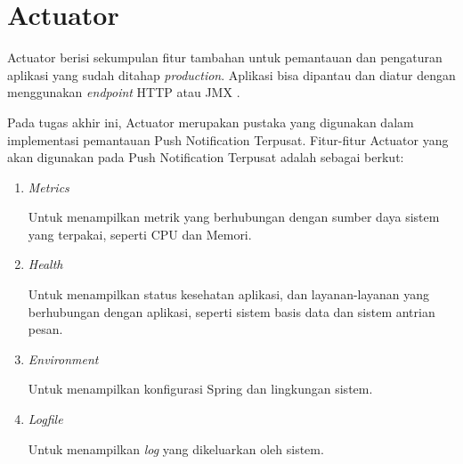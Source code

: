 \section{Actuator}
\par Actuator berisi sekumpulan fitur tambahan untuk pemantauan dan pengaturan aplikasi yang sudah ditahap \textit{production}. Aplikasi bisa dipantau dan diatur dengan menggunakan \textit{endpoint} HTTP atau JMX \cite{actuator-online}.
\par Pada tugas akhir ini, Actuator merupakan pustaka yang digunakan dalam implementasi pemantauan Push Notification Terpusat. Fitur-fitur Actuator yang akan digunakan pada Push Notification Terpusat adalah sebagai berkut:
\begin{enumerate}[listparindent=2.5em]
	\item \textit{Metrics}
	\par Untuk menampilkan metrik yang berhubungan dengan sumber daya sistem yang terpakai, seperti CPU dan Memori.
	\item \textit{Health}
	\par Untuk menampilkan status kesehatan aplikasi, dan layanan-layanan yang berhubungan dengan aplikasi, seperti sistem basis data dan sistem antrian pesan.
	\item \textit{Environment}
	\par Untuk menampilkan konfigurasi Spring dan lingkungan sistem.
	\item \textit{Logfile}
	\par Untuk menampilkan \textit{log} yang dikeluarkan oleh sistem.
\end{enumerate}

